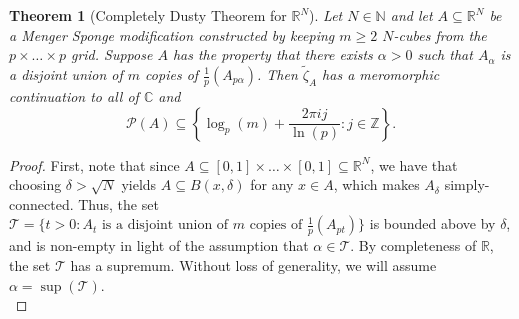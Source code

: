 \documentclass{article}
\theoremstyle{plain}
\newtheorem{theorem}{Theorem}
\numberwithin{equation}{section}
\numberwithin{table}{section}
\numberwithin{figure}{section}
\begin{document}
\begin{theorem}[Completely Dusty Theorem for $\mathbb{R}^N$] \label{thm:alphaconnectedRN}
Let $N \in \mathbb{N}$ and let $A \subseteq \mathbb{R}^N$ be a Menger Sponge modification constructed by keeping $m \geq 2$ $N$-cubes from the $p \times\dots\times p$ grid. Suppose $A$ has the property that there exists $\alpha > 0$ such that $A_{\alpha}$ is a disjoint union of $m$ copies of $\frac{1}{p} \left(A_{p\alpha}\right)$. Then $\tilde{\zeta}_A$ has a meromorphic continuation to all of $\mathbb{C}$ and
\begin{equation}
\mathscr{P}(A) \subseteq \left\{\log_p(m) + \frac{2\pi i j}{\ln(p)}: j \in \mathbb{Z}\right\}.
\end{equation}
\end{theorem}
\begin{proof}
First, note that since $A \subseteq [0,1]\times\dots\times[0,1] \subseteq \mathbb{R}^N$, we have that choosing $\delta > \sqrt{N}$ yields $A \subseteq B(x,\delta)$ for any $x \in A$, which makes $A_{\delta}$ simply-connected. Thus, the set $\mathscr{T} = \{t > 0 : A_t \text{ is a disjoint union of $m$ copies of $\frac{1}{p} \left(A_{pt}\right)$}\}$ is bounded above by $\delta$, and is non-empty in light of the assumption that $\alpha \in \mathscr{T}$. By completeness of $\mathbb{R}$, the set $\mathscr{T}$ has a supremum. Without loss of generality, we will assume $\alpha = \sup(\mathscr{T})$. \\


\end{proof}
\end{document}
